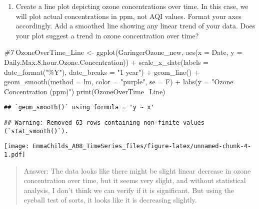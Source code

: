 \documentclass[
]{article}
\newenvironment{Shaded}{\begin{snugshade}}{\end{snugshade}}
\newcommand{\AttributeTok}[1]{\textcolor[rgb]{0.77,0.63,0.00}{#1}}
\newcommand{\CommentTok}[1]{\textcolor[rgb]{0.56,0.35,0.01}{\textit{#1}}}
\newcommand{\FloatTok}[1]{\textcolor[rgb]{0.00,0.00,0.81}{#1}}
\newcommand{\FunctionTok}[1]{\textcolor[rgb]{0.00,0.00,0.00}{#1}}
\newcommand{\NormalTok}[1]{#1}
\newcommand{\OtherTok}[1]{\textcolor[rgb]{0.56,0.35,0.01}{#1}}
\newcommand{\SpecialCharTok}[1]{\textcolor[rgb]{0.00,0.00,0.00}{#1}}
\newcommand{\StringTok}[1]{\textcolor[rgb]{0.31,0.60,0.02}{#1}}
\providecommand{\tightlist}{%
  \setlength{\itemsep}{0pt}\setlength{\parskip}{0pt}}
\begin{document}
\begin{enumerate}
\def\labelenumi{\arabic{enumi}.}
\setcounter{enumi}{6}
\tightlist
\item
  Create a line plot depicting ozone concentrations over time. In this
  case, we will plot actual concentrations in ppm, not AQI values.
  Format your axes accordingly. Add a smoothed line showing any linear
  trend of your data. Does your plot suggest a trend in ozone
  concentration over time?
\end{enumerate}

\begin{Shaded}
\begin{Highlighting}[]
\CommentTok{\#7}
\NormalTok{OzoneOverTime\_Line }\OtherTok{\textless{}{-}} \FunctionTok{ggplot}\NormalTok{(GaringerOzone\_new, }
    \FunctionTok{aes}\NormalTok{(}\AttributeTok{x =}\NormalTok{ Date, }\AttributeTok{y =}\NormalTok{ Daily.Max.}\FloatTok{8.}\NormalTok{hour.Ozone.Concentration)) }\SpecialCharTok{+}
  \FunctionTok{scale\_x\_date}\NormalTok{(}\AttributeTok{labels =} \FunctionTok{date\_format}\NormalTok{(}\StringTok{"\%Y"}\NormalTok{), }\AttributeTok{date\_breaks =} \StringTok{"1 year"}\NormalTok{) }\SpecialCharTok{+} 
      \FunctionTok{geom\_line}\NormalTok{() }\SpecialCharTok{+}
    \FunctionTok{geom\_smooth}\NormalTok{(}\AttributeTok{method =}\NormalTok{ lm, }\AttributeTok{color =} \StringTok{"purple"}\NormalTok{, }\AttributeTok{se =}\NormalTok{ F) }\SpecialCharTok{+}
    \FunctionTok{labs}\NormalTok{(}\AttributeTok{y =} \StringTok{"Ozone Concentration (ppm)"}\NormalTok{)}
\FunctionTok{print}\NormalTok{(OzoneOverTime\_Line)}
\end{Highlighting}
\end{Shaded}

\begin{verbatim}
## `geom_smooth()` using formula = 'y ~ x'
\end{verbatim}

\begin{verbatim}
## Warning: Removed 63 rows containing non-finite values (`stat_smooth()`).
\end{verbatim}

\texttt{[image: EmmaChilds\_A08\_TimeSeries\_files/figure-latex/unnamed-chunk-4-1.pdf]}

\begin{quote}
Answer: The data looks like there might be slight linear decrease in
ozone concentration over time, but it seems very slight, and without
statistical analysis, I don't think we can verify if it is significant.
But using the eyeball test of sorts, it looks like it is decreasing
slightly.
\end{quote}
\end{document}
